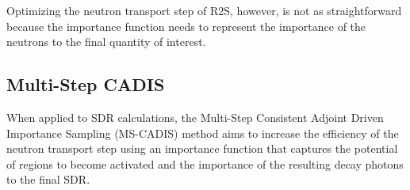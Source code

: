 Optimizing the neutron transport step of R2S, however, is not as
straightforward
because the importance function needs to represent the importance of the neutrons to the
final quantity of interest\cite{mscadis}.

\subsection{Multi-Step CADIS}
When applied to SDR calculations, the Multi-Step Consistent Adjoint Driven Importance Sampling (MS-CADIS) method
aims to increase the efficiency of the neutron transport step using an importance function
that captures the potential of regions to become activated and the importance of
the resulting decay photons to the final SDR\cite{mscadis}.

